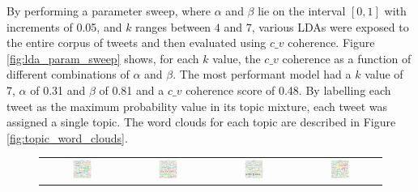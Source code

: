 By performing a parameter sweep, where $\alpha$ and $\beta$ lie on the interval
$[0, 1]$ with increments of 0.05, and $k$ ranges between $4$ and $7$, various
LDAs were exposed to the entire corpus of tweets and then evaluated using $c\_v$
coherence. Figure \ref{fig:lda_param_sweep} shows, for each $k$ value, the $c\_v$ coherence as a
function of different combinations of $\alpha$ and $\beta$. The most performant
model had a $k$ value of 7, $\alpha$ of 0.31 and $\beta$ of 0.81 and a $c\_v$
coherence score of 0.48. By labelling each tweet as the maximum probability
value in its topic mixture, each tweet was assigned a single topic. The word
clouds for each topic are described in Figure \ref{fig:topic_word_clouds}.

\begin{figure}[h!]
    \centering
    \begin{tabular}{cccc}
    \includegraphics[width=0.25\textwidth]{Figures/topic_1_wordcloud} &
    \includegraphics[width=0.25\textwidth]{Figures/topic_2_wordcloud} &
    \includegraphics[width=0.25\textwidth]{Figures/topic_3_wordcloud} &
    \includegraphics[width=0.25\textwidth]{Figures/topic_4_wordcloud} \\

\end{tabular}
\end{figure}
